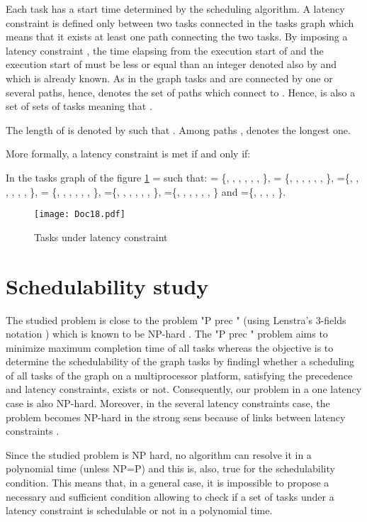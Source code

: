 \documentclass{ijcaArticle}
\begin{document}
Each task  has a start time  determined by the scheduling algorithm.  A latency constraint is defined only between two tasks connected in the tasks graph which means that it exists at least one path connecting the two tasks. By imposing a latency constraint
, the time elapsing from the execution start of  and the execution start of  must be less or equal than an integer denoted also by  and which is already known. As in the graph tasks  and  are connected by one or several paths, hence,  denotes the set of paths  which connect  to .  Hence,  is also a set of sets of tasks meaning that . 

The length  of  is denoted by  such that . Among paths ,    denotes the longest one.  

More formally, a latency constraint   is met if and only if:



In the tasks graph of the figure \ref{cons-clust}  = such that:  = \{, , , , , , \},  = \{, , , , , , \},  =\{, , , , , , \}, 
= \{, , , , , , \}, =\{, , , , , , \}, =\{, , , , , , \} and =\{, , , , \}.

\begin{figure}[h!] 
\begin{center} 
\texttt{[image: Doc18.pdf]} 
\caption{ Tasks under latency constraint} 
\label{cons-clust} \end{center} 
\end{figure}



\section{Schedulability study}
The studied problem is close to the problem "P  prec  " (using Lenstra's 3-fields notation \cite{grah79}) which is known to be
NP-hard \cite{grah79}. The "P  prec  " problem aims to minimize maximum completion time of all tasks whereas the objective is to determine the schedulability of the graph tasks by findingl whether a scheduling of all tasks of the graph on a multiprocessor platform, satisfying the precedence and latency constraints, exists or not. Consequently, our problem in a one latency case is also NP-hard. Moreover, in the several latency constraints case, the problem becomes NP-hard in the strong sens because of links between latency constraints .   

Since the studied problem is NP hard, no algorithm can resolve it in a polynomial time (unless NP=P) and this is, also, true for the schedulability condition. This means that, in a
general case, it is impossible to propose a necessary and sufficient condition allowing to check if a set of tasks under a latency constraint is schedulable or not in a polynomial time.
\end{document}
